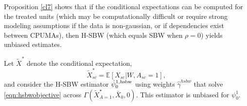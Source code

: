 


 Proposition \ref{cl7} shows that if the conditional expectations can be computed for the treated units (which may be computationally difficult or require strong modeling assumptions if the data is non-gaussian, or if dependencies exist between CPUMAs), then H-SBW (which equals SBW when $\rho=0$) yields unbiased estimates. 

\begin{proposition}\label{cl7}
    Let $\tilde{X}^*$ denote the conditional expectation,
    \[\tilde{X}^*_{sc} = \mathbb{E}[X_{sc} | W, A_{sc}=1],\]
    and consider the H-SBW estimator $\hat{\psi}_0^{1, \textup{hsbw}}$ using weights $\hat{\gamma}^{hsbw}$ that solve \eqref{eqn:hsbwobjective} across $\Gamma(\tilde{X}^\star_{A=1}, \bar{X}_0, 0)$. This estimator is unbiased for $\psi_0^1$.
\end{proposition}



